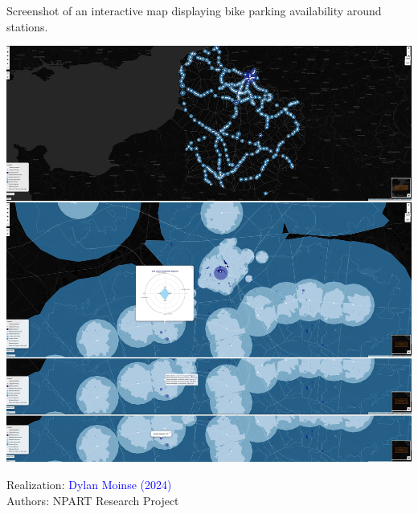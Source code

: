 \begin{refsegment}
\begin{carte}[h!]\vspace*{4pt}
    \caption{Screenshot of an interactive map displaying bike parking availability around stations.}
    \label{fig-chap6:carte-interactive}
    \centerline{\includegraphics[width=1\columnwidth]{src/Figures/Chap-6/FR_EN_NPART_Carte_interactive.jpeg}}
    \vspace{5pt}
    \begin{flushright}\scriptsize{
    Realization: \textcolor{blue}{Dylan Moinse (2024)}
    \\
    Authors: \acrshort{NPART} Research Project
    }\end{flushright}
\end{carte}



\end{refsegment}
